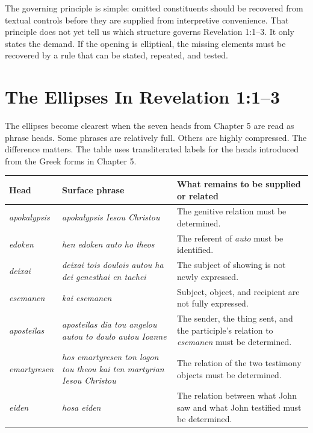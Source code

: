 The governing principle is simple: omitted constituents should be recovered from textual controls before they are supplied from interpretive convenience. That principle does not yet tell us which structure governs Revelation 1:1--3. It only states the demand. If the opening is elliptical, the missing elements must be recovered by a rule that can be stated, repeated, and tested.

\section{The Ellipses In Revelation 1:1--3}

The ellipses become clearest when the seven heads from Chapter 5 are read as phrase heads. Some phrases are relatively full. Others are highly compressed. The difference matters. The table uses transliterated labels for the heads introduced from the Greek forms in Chapter 5.

\begin{center}
\begin{longtable}{@{}L{0.18\textwidth}L{0.36\textwidth}L{0.34\textwidth}@{}}
\toprule
Head & Surface phrase & What remains to be supplied or related \\
\midrule
\textit{apokalypsis} & \textit{apokalypsis Iesou Christou} & The genitive relation must be determined. \\
\textit{edoken} & \textit{hen edoken auto ho theos} & The referent of \textit{auto} must be identified. \\
\textit{deixai} & \textit{deixai tois doulois autou ha dei genesthai en tachei} & The subject of showing is not newly expressed. \\
\textit{esemanen} & \textit{kai esemanen} & Subject, object, and recipient are not fully expressed. \\
\textit{aposteilas} & \textit{aposteilas dia tou angelou autou to doulo autou Ioanne} & The sender, the thing sent, and the participle's relation to \textit{esemanen} must be determined. \\
\textit{emartyresen} & \textit{hos emartyresen ton logon tou theou kai ten martyrian Iesou Christou} & The relation of the two testimony objects must be determined. \\
\textit{eiden} & \textit{hosa eiden} & The relation between what John saw and what John testified must be determined. \\
\bottomrule
\end{longtable}
\end{center}

